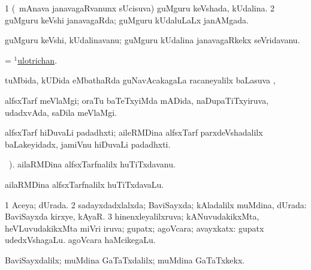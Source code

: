 \bentry
{} 
\gl{\gu}
\expl{}
\bmng
\bnum
\num{1} (\kanmu\ mAnava janavagaRvanunx sUcisuva) guMguru keVshada, kUdalina. 
\num{2} guMguru keVshi janavagaRda; guMguru kUdaluLaLx janAMgada. 
\enum
\emng
\eentry

\bentry
{} 
\gl{\nA}
\expl{}
\bmng
guMguru keVshi, kUdalinavanu; guMguru kUdalina janavagaRkekx seVridavanu. 
\emng
\eentry

\bentry
{} 
\gl{\gu}
\expl{}
\bmng
= \hyperlink{ulotrichan(1)}{$^1$ulotrichan}. 
\emng
\eentry

\bentry
{} 
\gl{\uparx}
\expl{}
\bmng
tuMbida, kUDida eMbathaRda guNavAcakagaLa racaneyalilx baLasuva \uparx, \udA\  
\emng
\eentry

\bentry
{} 
\gl{\nA}
\expl{}
\bmng
alfsxTarf meVlaMgi; oraTu baTeTxyiMda mADida, naDupaTiTxyiruva, udadxvAda, saDila meVlaMgi. 
\emng
\eentry

\bentry
{} 
\gl{\nA}
\expl{}
\bmng
alfsxTarf hiDuvaLi padadhxti; aileRMDina alfsxTarf parxdeVshadalilx baLakeyidadx, jamiVnu hiDuvaLi padadhxti. 
\emng
\eentry

\bentry
{} 
\gl{\nA}
\bava\ ). \bmng
ailaRMDina alfsxTarfnalilx huTiTxdavanu. 
\emng
\eentry

\bentry
{} 
\gl{\nA}
\expl{}
\bmng
ailaRMDina alfsxTarfnalilx huTiTxdavaLu. 
\emng
\eentry

\bentry
{}
\gl{\saMkiSx}
\expl{}
\bmng
{} 
\emng
\eentry

\bentry
{} 
\gl{\gu}
\expl{}
\bmng
\bnum
\num{1} Aceya; dUrada. 
\num{2} sadayxdadxlalxda; BaviSayxda; kAladalilx muMdina, dUrada:  BaviSayxda kirxye, kAyaR. 
\num{3} hinenxleyalilxruva; kANuvudakikxMta, heVLuvudakikxMta miVri iruva; gupatx; agoVcara; avayxkatx:  gupatx udedxVshagaLu.  agoVcara haMcikegaLu. 
\enum
\emng
\eentry

\bentry
{} 
\gl{\kirxvi}
\expl{}
\bmng
BaviSayxdalilx; muMdina GaTaTxdalilx; muMdina GaTaTxkekx. 
\emng
\eentry

